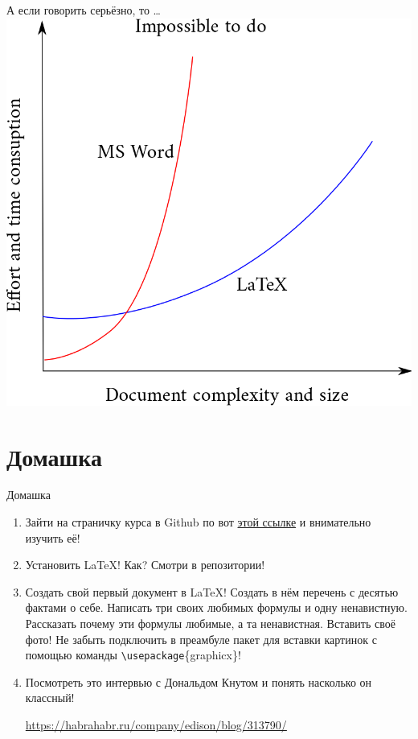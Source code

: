 \documentclass[newPxFont]{beamer}
\begin{document}
\begin{frame}{А если говорить серьёзно, то \ldots} 
    \centering
    \includegraphics[scale=0.2]{latexvsword.png}
\end{frame}


\section{Домашка}
\begin{frame}[fragile]{Домашка}
\begin{enumerate}
\item Зайти на страничку курса в Github по вот {\color{blue} \href{https://github.com/FUlyankin/LaTeX/wiki}{этой ссылке}} и внимательно изучить её! 
\item Установить \LaTeX{}! Как? Смотри в репозитории! 
\item Создать свой первый документ в \LaTeX! Создать в нём перечень с       десятью фактами о себе. Написать три своих любимых формулы и одну ненавистную.      Рассказать почему эти формулы любимые, а та ненавистная. Вставить своё фото!  Не забыть подключить в преамбуле пакет для вставки картинок с помощью команды \verb|\usepackage|\{graphicx\}!
\item Посмотреть это интервью с Дональдом Кнутом и понять насколько он классный! 
\centerline {\url{https://habrahabr.ru/company/edison/blog/313790/}} 
\end{enumerate}
\end{frame}
\end{document}
